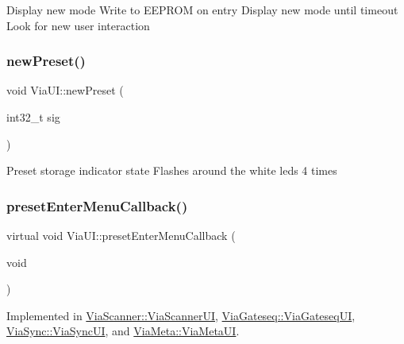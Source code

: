 Display new mode Write to E\+E\+P\+R\+OM on entry Display new mode until timeout Look for new user interaction \mbox{\label{class_via_u_i_a3ead361fc18c9079dcd97b9f34124898}} 
\subsubsection{\texorpdfstring{new\+Preset()}{newPreset()}}
{\footnotesize\ttfamily void Via\+U\+I\+::new\+Preset (\begin{DoxyParamCaption}\item[{int32\+\_\+t}]{sig }\end{DoxyParamCaption})}

Preset storage indicator state Flashes around the white leds 4 times \mbox{\label{class_via_u_i_ad4dfd9fa424267358cab83bec4ee1f23}} 
\subsubsection{\texorpdfstring{preset\+Enter\+Menu\+Callback()}{presetEnterMenuCallback()}}
{\footnotesize\ttfamily virtual void Via\+U\+I\+::preset\+Enter\+Menu\+Callback (\begin{DoxyParamCaption}\item[{void}]{ }\end{DoxyParamCaption})\hspace{0.3cm}{\ttfamily [pure virtual]}}



Implemented in \mbox{\hyperlink{class_via_scanner_1_1_via_scanner_u_i_ac67240d1c9ebc47569185776d9d4403b}{Via\+Scanner\+::\+Via\+Scanner\+UI}}, \mbox{\hyperlink{class_via_gateseq_1_1_via_gateseq_u_i_af0d1fcd037084b122f68ea1522080fd7}{Via\+Gateseq\+::\+Via\+Gateseq\+UI}}, \mbox{\hyperlink{class_via_sync_1_1_via_sync_u_i_a390deaa64d96fa447720294817149dde}{Via\+Sync\+::\+Via\+Sync\+UI}}, and \mbox{\hyperlink{class_via_meta_1_1_via_meta_u_i_a21cd6b42537b8abe34cfe65258455991}{Via\+Meta\+::\+Via\+Meta\+UI}}.

\mbox{\label{class_via_u_i_a5a2d75e2625e2b55f0588ba8925fe45f}} 
